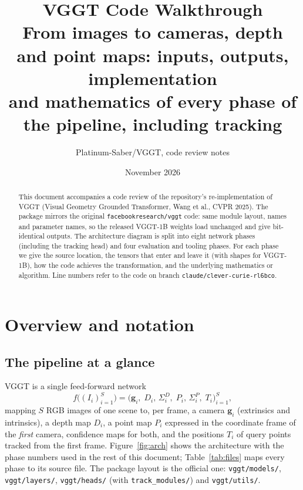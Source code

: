 \documentclass[11pt,a4paper]{article}
\title{\textbf{VGGT Code Walkthrough}\\[4pt]
\large From images to cameras, depth and point maps: inputs, outputs, implementation\\
and mathematics of every phase of the pipeline, including tracking}
\author{Platinum-Saber/VGGT, code review notes}
\date{November 2026}
\begin{document}
\maketitle

\begin{abstract}
This document accompanies a code review of the repository's re-implementation of VGGT (Visual Geometry Grounded
Transformer, Wang et al., CVPR 2025). The package mirrors the original \texttt{facebookresearch/vggt} code: same module
layout, names and parameter names, so the released VGGT-1B weights load unchanged and give bit-identical outputs. The
architecture diagram is split into eight network phases (including the tracking head) and four evaluation and tooling
phases. For each phase we give the source location, the tensors that enter and leave it (with shapes for VGGT-1B), how the
code achieves the transformation, and the underlying mathematics or algorithm. Line numbers refer to the code on branch
\texttt{claude/clever-curie-rl6bco}.
\end{abstract}

\tableofcontents
\newpage

\section{Overview and notation}

\subsection{The pipeline at a glance}

VGGT is a single feed-forward network
\[
  f\big((I_i)_{i=1}^{S}\big) = \big(\mathbf{g}_i,\; D_i,\, \Sigma^D_i,\; P_i,\, \Sigma^P_i,\; T_i\big)_{i=1}^{S},
\]
mapping $S$ RGB images of one scene to, per frame, a camera $\mathbf{g}_i$ (extrinsics and intrinsics), a depth map $D_i$,
a point map $P_i$ expressed in the coordinate frame of the \emph{first} camera, confidence maps for both, and the positions
$T_i$ of query points tracked from the first frame. Figure~\ref{fig:arch} shows the architecture with the phase numbers used
in the rest of this document; Table~\ref{tab:files} maps every phase to its source file. The package layout is the official
one: \texttt{vggt/models/}, \texttt{vggt/layers/}, \texttt{vggt/heads/} (with \texttt{track\_modules/}) and \texttt{vggt/utils/}.
\end{document}
